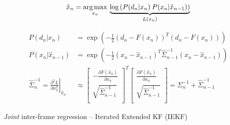 \begin{algorithm}
\begin{equation*}
\begin{aligned}
\hat{x}_n &= \operatorname*{arg\,max}_{x_n} \:
\underbrace{\log \left( P(d_n|x_n) \: P(x_n |\hat{x}_{n - 1}) \right)}_{L(x_n)}   
\\
\end{aligned}
\end{equation*}

\begin{equation*}
\begin{aligned}
P(d_n|x_n) &= \exp \left( -\tfrac{1}{2} (d_n - F(x_n))^T (d_n - F(x_n)) \right)
\\
P(x_n |\hat{x}_{n - 1}) &= \exp \left( -\tfrac{1}{2}(x_n - \hat{x}_{n - 1})^T \hat{\Sigma}_{n - 1}^{-1} (x_n - \hat{x}_{n - 1})\right)
\\
\hat{\Sigma}_n^{-1} = 
\left.\tfrac{\partial^2 L}{\partial x_n^2}\right|_{\hat{x}_n} &\approx 
\left[
	\begin{array}{cc}
		- \tfrac{\partial F(\hat{x}_n)} {\partial x_n} \\
		\sqrt{\hat{\Sigma}_{n - 1}^{-1}} \\
	\end{array}
\right]^T 
\left[
	\begin{array}{c}
		\tfrac{\partial F(\hat{x}_n)} {\partial x_n} \\
		\sqrt{\hat{\Sigma}_{n - 1}^{-1}} \\
	\end{array}
\right] 
= \Sigma_{n}^{-1} + \hat{\Sigma}_{n-1}^{-1}  
\end{aligned}
\end{equation*}
\caption{\emph{Joint} inter-frame regression -- Iterated Extended KF (IEKF)}
\label{alg:interframeplus}
\label{alg:iekf-like}
\label{tab:iekf-like}
\end{algorithm}

